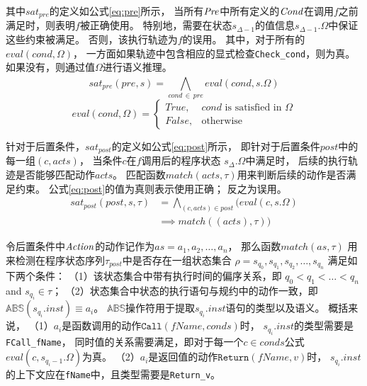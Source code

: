 其中$sat_{pre}$的定义如公式\ref{eq:pre}所示，
当所有$\mathit{Pre}$中所有定义的$\mathit{Cond}$在调用$f$之前满足时，则表明$f$被正确使用。
特别地，需要在状态$s_{\Delta-1}$的值信息$s_{\Delta-1}.\Omega$中保证这些约束被满足。
否则，该执行轨迹为$f$的误用。
其中，对于所有的$eval(cond, \Omega)$，
一方面如果轨迹中包含相应的显式检查\texttt{Check\_cond}，则为真。
如果没有，则通过值$\Omega$进行语义推理。
\begin{equation}
\label{eq:pre}
sat_{pre}(\mathit{pre}, s) = \bigwedge_{cond\,\in\,\mathit{pre}}^{} eval(cond, s.\Omega)
\end{equation}
\begin{equation}
\label{eq:eval}
eval(\mathit{cond}, \Omega) = 
\begin{cases}
True, & \text{$\mathit{cond}$ is satisfied in $\Omega$}\\
False,              & \text{otherwise}
\end{cases}
\end{equation}


针对于后置条件，$sat_{post}$的定义如公式\ref{eq:post}所示，
即针对于后置条件$\mathit{post}$中的每一组$(c,\mathit{acts})$，
当条件$c$在$f$调用后的程序状态 $s_{\Delta}.\Omega$中满足时，
后续的执行轨迹是否能够匹配动作$\mathit{acts}$。
匹配函数$\mathit{match}(\mathit{acts}, \tau)$用来判断后续的动作是否满足约束。
公式\ref{eq:post}的值为真则表示使用正确；
反之为误用。
\begin{align}
\label{eq:post}
sat_{post}(\mathit{post},s,\tau) &=  \bigwedge_{(c,acts) \in \mathit{post}}^{} 
\Big( eval(\mathit{c},s.\Omega) \nonumber \\
& \implies
match((acts), \tau) \Big)
\end{align}

令后置条件中$\mathit{Action}$的动作记作为$\mathit{as} = a_1, a_2, \dots,a_n$，
那么函数$\mathit{match}(\mathit{as}, \tau)$
用来检测在程序状态序列$\tau_{post}$中是否存在一组状态集合
$\rho = s_{q_0}, s_{q_1}, s_{q_2}, \dots,s_{q_n}$
满足如下两个条件：
（1）该状态集合中带有执行时间的偏序关系，即
$q_0 < q_1 < \ldots < q_n$ and $s_{q_i}\in\tau$；
（2）状态集合中状态的执行语句与规约中的动作一致，即
$\mathbb{ABS}(s_{q_i}.inst) \equiv a_i$。
$\mathbb{ABS}$操作符用于提取$s_{q_i}.inst$语句的类型以及语义。
概括来说，
（1）$a_i$是函数调用的动作$\texttt{Call}(\mathit{fName},\mathit{conds})$时，
$s_{q_i}.inst$的类型需要是\texttt{FCall\_fName}，
同时值的关系需要满足，即对于每一个$c \in conds$公式$eval(c, s_{q_i-1}.\Omega)$为真。
（2）$a_i$是返回值的动作$\texttt{Return}(\mathit{fName},\mathit{v})$时，
$s_{q_i}.inst$的上下文应在\texttt{fName}中，且类型需要是\texttt{Return\_v}。



